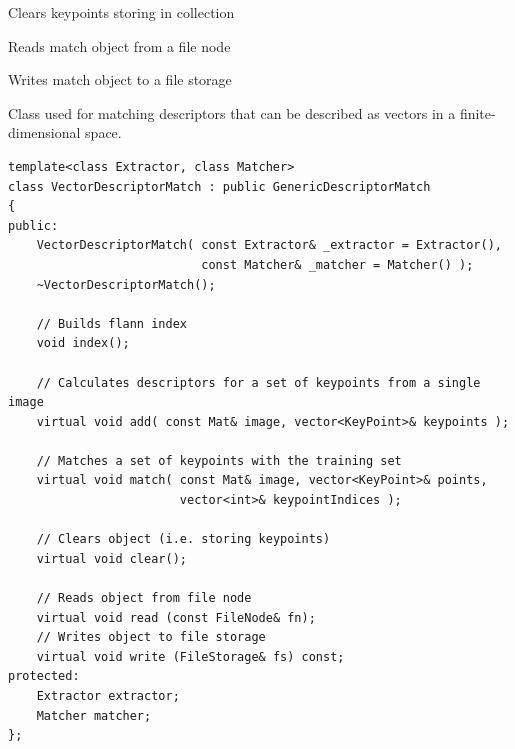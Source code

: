 
\begin{description}
\end{description}

Clears keypoints storing in collection


Reads match object from a file node
    

Writes match object to a file storage
    

Class used for matching descriptors that can be described as vectors in a finite-dimensional space.

\begin{lstlisting}
template<class Extractor, class Matcher>
class VectorDescriptorMatch : public GenericDescriptorMatch
{
public:
    VectorDescriptorMatch( const Extractor& _extractor = Extractor(),
                           const Matcher& _matcher = Matcher() );
    ~VectorDescriptorMatch();

    // Builds flann index
    void index();

    // Calculates descriptors for a set of keypoints from a single image
    virtual void add( const Mat& image, vector<KeyPoint>& keypoints );

    // Matches a set of keypoints with the training set
    virtual void match( const Mat& image, vector<KeyPoint>& points, 
                        vector<int>& keypointIndices );

    // Clears object (i.e. storing keypoints)
    virtual void clear();

    // Reads object from file node
    virtual void read (const FileNode& fn);
    // Writes object to file storage
    virtual void write (FileStorage& fs) const;
protected:
    Extractor extractor;
    Matcher matcher;
};
\end{lstlisting}

